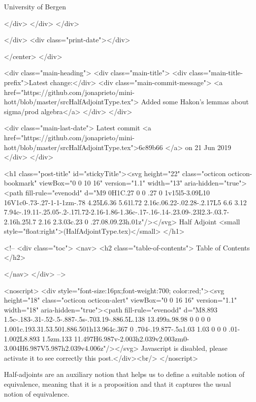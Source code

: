                   University of Bergen
                
                </div>
            </div>
          </div>
          
          
        </div>
        <div class="print-date"></div>
        
        
    </center>
  </div>

  
  <div class="main-heading">
    <div class="main-title">
      <div class="main-title-prefix">Latest change:</div>
      <div class="main-commit-message">
            <a href="https://github.com/jonaprieto/mini-hott/blob/master/srcHalfAdjointType.tex">
              Added some Hakon's lemmas about sigma/prod algebra</a>
      </div>
    </div>

    <div class="main-last-date">
      Latest commit <a href="https://github.com/jonaprieto/mini-hott/blob/master/srcHalfAdjointType.tex">6c89b66 </a> on  21 Jun 2019
    </div>
  </div>
  

  <h1 class="post-title" id="stickyTitle"><svg height="22" class="octicon octicon-bookmark" viewBox="0 0 10 16" version="1.1" width="13" aria-hidden="true"><path fill-rule="evenodd" d="M9 0H1C.27 0 0 .27 0 1v15l5-3.09L10 16V1c0-.73-.27-1-1-1zm-.78 4.25L6.36 5.61l.72 2.16c.06.22-.02.28-.2.17L5 6.6 3.12 7.94c-.19.11-.25.05-.2-.17l.72-2.16-1.86-1.36c-.17-.16-.14-.23.09-.23l2.3-.03.7-2.16h.25l.7 2.16 2.3.03c.23 0 .27.08.09.23h.01z"/></svg> Half Adjoint <small style="float:right">(HalfAdjointType.tex)</small>
  </h1>

  <!-- 
  <div class="toc">
    <nav>
    <h2 class="table-of-contents"> Table of Contents </h2>
      

    </nav>
  </div>
   -->

  <noscript>
  <div style="font-size:16px;font-weight:700; color:red;"><svg height="18" class="octicon octicon-alert" viewBox="0 0 16 16" version="1.1" width="18" aria-hidden="true"><path fill-rule="evenodd" d="M8.893 1.5c-.183-.31-.52-.5-.887-.5s-.703.19-.886.5L.138 13.499a.98.98 0 0 0 0 1.001c.193.31.53.501.886.501h13.964c.367 0 .704-.19.877-.5a1.03 1.03 0 0 0 .01-1.002L8.893 1.5zm.133 11.497H6.987v-2.003h2.039v2.003zm0-3.004H6.987V5.987h2.039v4.006z"/></svg> Javascript is disabled, please activate it to see correctly this post.</div><br/>
  </noscript>

  Half-adjoints are an auxiliary notion that helps us to define a suitable notion
of equivalence, meaning that it is a proposition and that it captures the usual
notion of equivalence.


